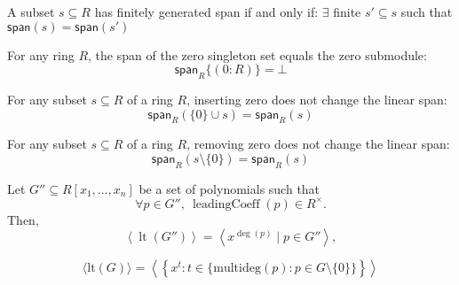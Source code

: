 \begin{lemma}\label{Ideal.fg_span_iff_fg_span_finset_subset}


  A subset $s \subseteq R$ has finitely generated span if and only if:
$\exists$ finite $s' \subseteq s$ such that $\mathsf{span}(s) = \mathsf{span}(s')$

\end{lemma}

\begin{lemma}\label{Ideal.span_singleton_zero}
  \leanok

  For any ring \( R \), the span of the zero singleton set equals the zero submodule:
\[
\mathsf{span}_R \{(0 : R)\} = \bot
\]

\end{lemma}

\begin{lemma}\label{Ideal.span_insert_zero}
  \leanok

  For any subset $s \subseteq R$ of a ring $R$, inserting zero does not change the linear span:
\[
\mathsf{span}_R(\{0\} \cup s) = \mathsf{span}_R(s)
\]

\end{lemma}

\begin{lemma}\label{Ideal.span_sdiff_singleton_zero}
  \leanok
  For any subset $s \subseteq R$ of a ring $R$, removing zero does not change the linear span:
\[
\mathsf{span}_R(s \setminus \{0\}) = \mathsf{span}_R(s)
\]

\end{lemma}

\begin{lemma}\label{MonomialOrder.leadingTerm_ideal_span_monomial}
  \leanok
  Let \( G'' \subseteq R[x_1, \dots, x_n] \) be a set of polynomials such that
\[
\forall p \in G'',\ \operatorname{leadingCoeff}(p) \in R^\times.
\]
Then,
\[
\left\langle \operatorname{lt}(G'') \right\rangle = \left\langle x^{\deg(p)} \mid p \in G'' \right\rangle,
\]

\end{lemma}

\begin{lemma}\label{MonomialOrder.leadingTerm_ideal_span_monomial'}
  \leanok
  \[
\langle \mathrm{lt}(G) \rangle = \left\langle \left\{ x^t : t \in \{ \mathrm{multideg}(p) : p \in G \setminus \{0\} \} \right\} \right\rangle
\]

\end{lemma}

